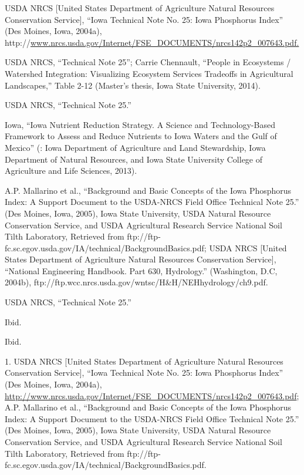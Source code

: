 \documentclass[11pt]{article}
\begin{document}
\begin{itemize}
\begin{thebibliography}{1}
  USDA NRCS [United States Department of Agriculture Natural Resources Conservation Service], “Iowa Technical Note No. 25: Iowa Phosphorus Index” (Des Moines, Iowa, 2004a), http://\url{www.nrcs.usda.gov/Internet/FSE_DOCUMENTS/nrcs142p2_007643.pdf.}
  
  USDA NRCS, “Technical Note 25”;   Carrie Chennault, “People in Ecosystems / Watershed Integration: Visualizing Ecosystem Services Tradeoffs in Agricultural Landscapes,” Table 2-12 (Master’s thesis, Iowa State University, 2014).
  
  USDA NRCS, “Technical Note 25.”
  
  Iowa, “Iowa Nutrient Reduction Strategy. A Science and Technology-Based Framework to Assess and Reduce Nutrients to Iowa Waters and the Gulf of Mexico” (: Iowa Department of Agriculture and Land Stewardship, Iowa Department of Natural Resources, and Iowa State University College of Agriculture and Life Sciences, 2013).
  
  A.P. Mallarino et al., “Background and Basic Concepts of the Iowa Phosphorus Index: A Support Document to the USDA-NRCS Field Office Technical Note 25.” (Des Moines, Iowa, 2005), Iowa State University, USDA Natural Resource Conservation Service, and USDA Agricultural Research Service National Soil Tilth Laboratory, Retrieved from ftp://ftp-fc.sc.egov.usda.gov/IA/technical/BackgroundBasics.pdf; USDA NRCS [United States Department of Agriculture Natural Resources Conservation Service], “National Engineering Handbook. Part 630, Hydrology.” (Washington, D.C, 2004b), ftp://ftp.wcc.nrcs.usda.gov/wntsc/H&H/NEHhydrology/ch9.pdf.
  
   USDA NRCS, “Technical Note 25.”
  
   Ibid.
  
   Ibid.
  
   1. USDA NRCS [United States Department of Agriculture Natural Resources Conservation Service], “Iowa Technical Note No. 25: Iowa Phosphorus Index” (Des Moines, Iowa, 2004a), \url{http://www.nrcs.usda.gov/Internet/FSE_DOCUMENTS/nrcs142p2_007643.pdf}; A.P. Mallarino et al., “Background and Basic Concepts of the Iowa Phosphorus Index: A Support Document to the USDA-NRCS Field Office Technical Note 25.” (Des Moines, Iowa, 2005), Iowa State University, USDA Natural Resource Conservation Service, and USDA Agricultural Research Service National Soil Tilth Laboratory, Retrieved from ftp://ftp-fc.sc.egov.usda.gov/IA/technical/BackgroundBasics.pdf.
  

\end{thebibliography}
\end{itemize}
\end{document}
